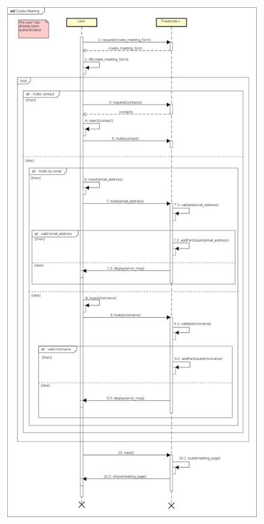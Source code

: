 \begin{figure}[!h]
	\centering\includegraphics[height=\textheight]{Images/SequenceDiagrams/User/CreateMeeting.png}{}
	\caption{}
\end{figure}

